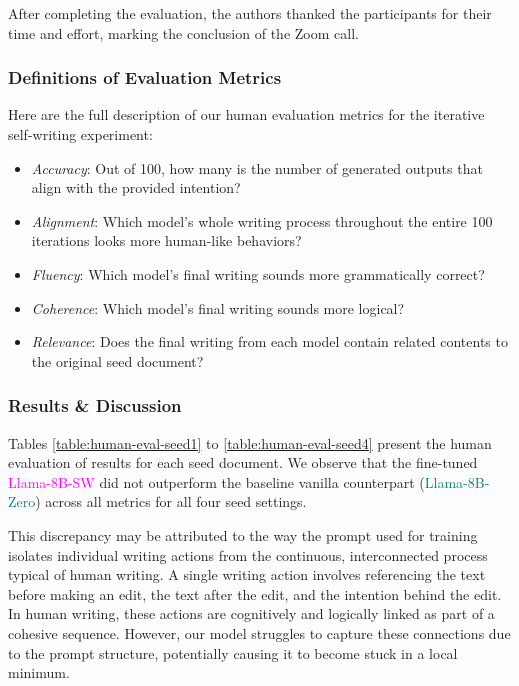 After completing the evaluation, the authors thanked the participants for their time and effort, marking the conclusion of the Zoom call.

\subsubsection{Definitions of Evaluation Metrics}

Here are the full description of our human evaluation metrics for the iterative self-writing experiment:

\begin{itemize}
    \item \textit{Accuracy}: Out of 100,  how many is the number of generated outputs that align with the provided intention? 
    \item \textit{Alignment}: Which model's whole writing process throughout the entire 100 iterations looks more human-like behaviors?
    \item \textit{Fluency}: Which model’s final writing sounds more grammatically correct?
    \item \textit{Coherence}: Which model’s final writing sounds more logical? 
    \item \textit{Relevance}: Does the final writing from each model contain related contents to the original seed document? 
\end{itemize}


\subsubsection{Results \& Discussion}

Tables \ref{table:human-eval-seed1} to \ref{table:human-eval-seed4} present the human evaluation of results for each seed document. We observe that the fine-tuned \textcolor{magenta}{Llama-8B-SW} did not outperform the baseline vanilla counterpart (\textcolor{teal}{Llama-8B-Zero}) across all metrics for all four seed settings. 

This discrepancy may be attributed to the way the prompt used for training isolates individual writing actions from the continuous, interconnected process typical of human writing. A single writing action involves referencing the text before making an edit, the text after the edit, and the intention behind the edit. In human writing, these actions are cognitively and logically linked as part of a cohesive sequence. However, our model struggles to capture these connections due to the prompt structure, potentially causing it to become stuck in a local minimum. 

